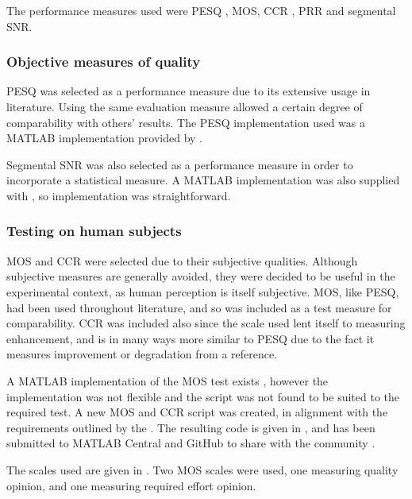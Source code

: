 The performance measures used were \ac{PESQ} \citep{InternationalTelecommunicationUnion2001},
\ac{MOS}, \ac{CCR} \citep{InternationalTelecommunicationUnion1996},
\ac{PRR} and segmental \ac{SNR}.


\subsubsection*{Objective measures of quality}

\ac{PESQ} was selected as a performance measure due to its extensive
usage in literature. Using the same evaluation measure allowed a certain
degree of comparability with others' results. The \ac{PESQ} implementation
used was a MATLAB implementation provided by \citet{Loizou2008}.

Segmental \ac{SNR} was also selected as a performance measure in
order to incorporate a statistical measure. A MATLAB implementation
was also supplied with \citep{Loizou2008}, so implementation was
straightforward.


\subsubsection*{Testing on human subjects}

\ac{MOS} and \ac{CCR} were selected due to their subjective qualities.
Although subjective measures are generally avoided, they were decided
to be useful in the experimental context, as human perception is itself
subjective. \ac{MOS}, like \ac{PESQ}, had been used throughout literature,
and so was included as a test measure for comparability. \ac{CCR}
was included also since the scale used lent itself to measuring enhancement,
and is in many ways more similar to \ac{PESQ} due to the fact it
measures improvement or degradation from a reference.

A MATLAB implementation of the \ac{MOS} test exists \citep{Ruzanski2009},
however the implementation was not flexible and the script was not
found to be suited to the required test. A new \ac{MOS} and \ac{CCR}
script was created, in alignment with the requirements outlined by
the \citet{InternationalTelecommunicationUnion1996}. The resulting
code is given in , and has been submitted
to MATLAB Central and GitHub to share with the community \citep{Gillman2014}.

The scales used are given in . Two \ac{MOS}
scales were used, one measuring quality opinion, and one measuring
required effort opinion.

